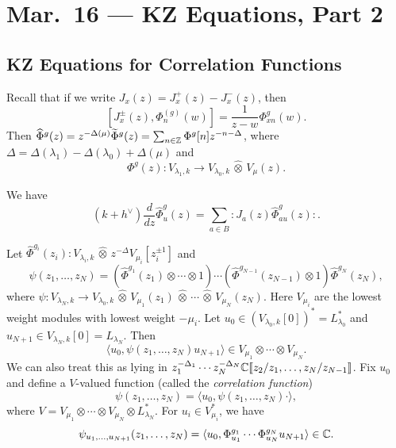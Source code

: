 \chapter{Mar.~16 --- KZ Equations, Part 2}

\section{KZ Equations for Correlation Functions}
\begin{remark}
  Recall that if we write
  $J_x(z) = J^+_x(z) - J_x^-(z)$, then
  \[
    [J^{\pm}_x(z), \Phi_n^{(g)}(w)]
    = \frac{1}{z - w} \Phi^g_{xn}(w).
  \]
  Then $\widehat{\Phi}^g(z) = z^{-\Delta(\mu)} \widetilde{\Phi}^g(z) = \sum_{n \in \mathbb{Z}} \Phi^g[n] z^{-n - \Delta}$,
  where
  $\Delta = \Delta(\lambda_1) - \Delta(\lambda_0) + \Delta(\mu)$ and
  \[
    \Phi^g(z)
    : V_{\lambda_1, k} \longrightarrow
    V_{\lambda_0, k}\, \widehat{\otimes}\, V_{\mu}(z).
  \]
\end{remark}

\begin{theorem}
  We have
  \[
    (k + h^\vee) \frac{d}{dz} \widehat{\Phi}^g_u(z)
    = \sum_{a \in B} {:}J_a(z) \widehat{\Phi}^g_{au}(z){:}.
  \]
\end{theorem}

\begin{remark}
  Let $\widehat{\Phi}^{g_i}(z_i) : V_{\lambda_i, k}\, \widehat{\otimes}\, z^{-\Delta} V_{\mu_i}[z_i^{\pm 1}]$
  and
  \[
    \psi(z_1, \dots, z_N)
    = (\widehat{\Phi}^{g_1}(z_1) \otimes \cdots \otimes 1) \cdots
    (\widehat{\Phi}^{g_{N-1}}(z_{N - 1}) \otimes 1)
    \widehat{\Phi}^{g_N}(z_N),
  \]
  where $\psi : V_{\lambda_N, k} \to V_{\lambda_0, k}\, \widehat{\otimes}\, V_{\mu_1}(z_1)\, \widehat{\otimes}\, \cdots \,\widehat{\otimes}\, V_{\mu_N}(z_N)$.
  Here $V_{\mu_i}$ are the lowest weight
  modules with lowest weight $-\mu_i$.
  Let $u_0 \in (V_{\lambda_0, k}[0])^* = L_{\lambda_0}^*$
  and $u_{N + 1} \in V_{\lambda_N, k}[0] = L_{\lambda_N}$.
  Then
  \[
    \langle u_0, \psi(z_1, \dots, z_N) u_{N + 1} \rangle
    \in V_{\mu_1} \otimes \cdots \otimes V_{\mu_N}.
  \]
  We can also treat this as lying in
  $z_1^{-\Delta_1} \cdots z_N^{-\Delta_N} \mathbb{C}\llbracket z_2 / z_1, \dots, z_N / z_{N - 1}\rrbracket$.
  Fix $u_0$ and define a $V$-valued
  function
  (called the \emph{correlation function})
  \[
    \psi(z_1, \dots, z_N)
    = \langle u_0, \psi(z_1, \dots, z_N) \cdot \rangle,
  \]
  where $V = V_{\mu_1} \otimes \cdots \otimes V_{\mu_N} \otimes L_{\lambda_N}^*$.
  For $u_i \in V_{\mu_i}^*$, we have
  \[
    \psi_{u_1, \dots, u_{N + 1}}(z_1, \dots, z_N)
    = \langle u_0, \Phi^{g_1}_{u_1} \cdots \Phi^{g_N}_{u_N} u_{N + 1} \rangle \in \mathbb{C}.
  \]
\end{remark}


